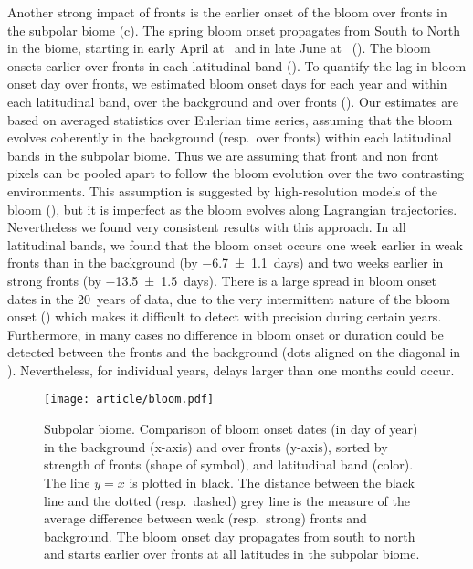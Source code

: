 Another strong impact of fronts is the earlier onset of the bloom over fronts in the subpolar biome (c).
The spring bloom onset propagates from South to North in the biome, starting in early April at~ and in late June at~ ().
The bloom onsets earlier over fronts in each latitudinal band ().
To quantify the lag in bloom onset day over fronts, we estimated bloom onset days for each year and within each latitudinal band, over the background and over fronts ().
Our estimates are based on averaged statistics over Eulerian time series, assuming that the bloom evolves coherently in the background (resp.\ over fronts) within each latitudinal bands in the subpolar biome.
Thus we are assuming that front and non front pixels can be pooled apart to follow the bloom evolution over the two contrasting environments.
This assumption is suggested by high-resolution models of the bloom (\cite[e.g.][]{levy_2005a, karleskind_2011}), but it is imperfect as the bloom evolves along Lagrangian trajectories.
Nevertheless we found very consistent results with this approach.
In all latitudinal bands, we found that the bloom onset occurs one week earlier in weak fronts than in the background (by \num{-6.7 \pm 1.1}~days) and two weeks earlier in strong fronts (by \num{-13.5 \pm 1.5}~days).
There is a large spread in bloom onset dates in the 20~years of data, due to the very intermittent nature of the bloom onset (\cite{keerthi_2021}) which makes it difficult to detect with precision during certain years.
Furthermore, in many cases no difference in bloom onset or duration could be detected between the fronts and the background (dots aligned on the diagonal in ).
Nevertheless, for individual years, delays larger than one months could occur.

\begin{figure}
  \centering
  \texttt{[image: article/bloom.pdf]}
  \caption[Comparison of bloom onset dates in the background and over fronts]{%
    Subpolar biome. Comparison of bloom onset dates (in day of year) in the background (x-axis) and over fronts (y-axis), sorted by strength of fronts (shape of symbol), and latitudinal band (color).
    The line \(y=x\) is plotted in black.
    The distance between the black line and the dotted (resp.\ dashed) grey line is the measure of the average difference between weak (resp.\ strong) fronts and background.
    The bloom onset day propagates from south to north and starts earlier over fronts at all latitudes in the subpolar biome.
  }%
  \label{fig:bloom}
\end{figure}


